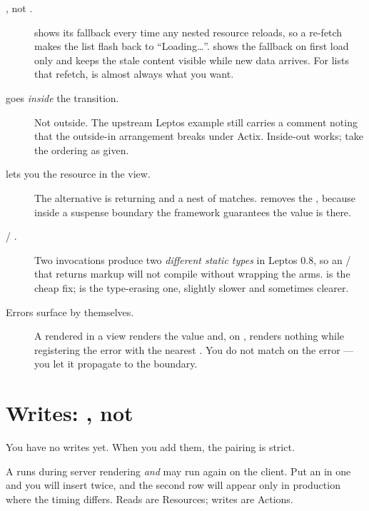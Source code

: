\begin{description}
  \item[, not .]  shows its fallback every time
    any nested resource reloads, so a re-fetch makes the list flash back to ``Loading\ldots''.
     shows the fallback on first load only and keeps the stale content visible
    while new data arrives. For lists that refetch,  is almost always what you
    want.

  \item[ goes \emph{inside} the transition.] Not outside. The upstream Leptos
    example still carries a comment noting that the outside-in arrangement breaks 
    under Actix. Inside-out works; take the ordering as given.

  \item[ lets you  the resource in the view.] The alternative is
     returning  and a nest of matches.
     removes the , because inside a suspense boundary the framework
    guarantees the value is there.

  \item[ / .] Two  invocations produce two
    \emph{different static types} in Leptos 0.8, so an / that returns markup
    will not compile without wrapping the arms.  is the cheap fix;
     is the type-erasing one, slightly slower and sometimes clearer.

  \item[Errors surface by themselves.] A  rendered in a view renders the 
    value and, on , renders nothing while registering the error with the nearest
    . You do not match on the error --- you let it propagate to the boundary.
\end{description}

\section{Writes: , not }

You have no writes yet. When you add them, the pairing is strict.

\begin{antipattern}
A  runs during server rendering \emph{and} may run again on the client. Put an
 in one and you will insert twice, and the second row will appear only in production
where the timing differs. Reads are Resources; writes are Actions.
\end{antipattern}


